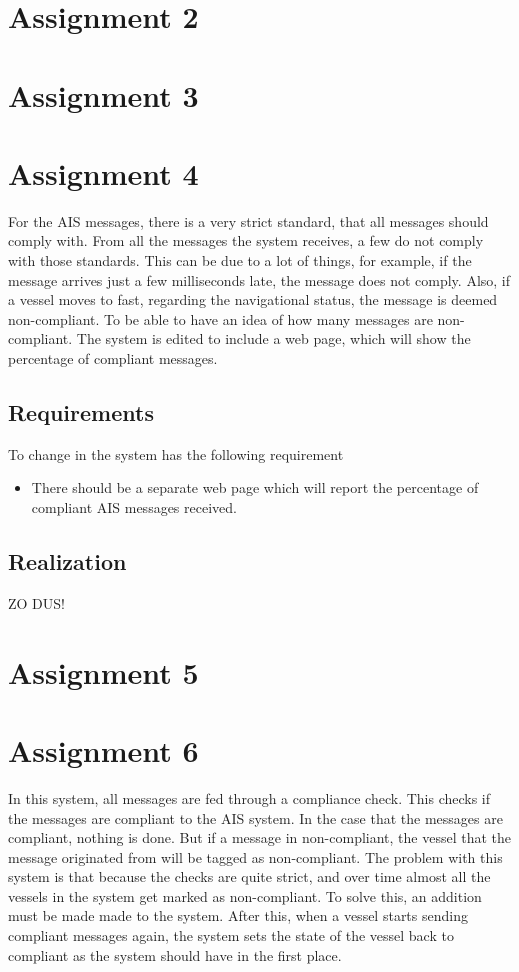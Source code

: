 \documentclass[12pt]{article}
\begin{document}
\section*{Assignment 2}

\section*{Assignment 3}

\section*{Assignment 4}
For the AIS messages, there is a very strict standard, that all  messages should comply with. From all the messages the system receives, a few do not comply with those standards. This can be due to a lot of things, for example, if the message arrives just a few milliseconds late, the message does not comply. Also, if a vessel moves to fast, regarding the navigational status, the message is deemed non-compliant. To be able to have an idea of how many messages are non-compliant. The system is edited to include a web page, which will show the percentage of compliant messages.

\subsection*{Requirements}
To change in the system has the following requirement
\begin{itemize}
\item There should be a separate web page which will report the percentage of compliant AIS messages received.
\end{itemize}

\subsection*{Realization}
ZO DUS!

\section*{Assignment 5}

\section*{Assignment 6}
In this system, all messages are fed through a compliance check. This checks if the messages are compliant to the AIS system. In the case that the messages are compliant, nothing is done. But if a message in non-compliant, the vessel that the message originated from will be tagged as non-compliant. The problem with this system is that because the checks are quite strict, and over time almost all the vessels in the system get marked as non-compliant. To solve this, an addition must be made made to the system. After this, when a vessel starts sending compliant messages again, the system sets the state of the vessel back to compliant as the system should have in the first place.
\end{document}
